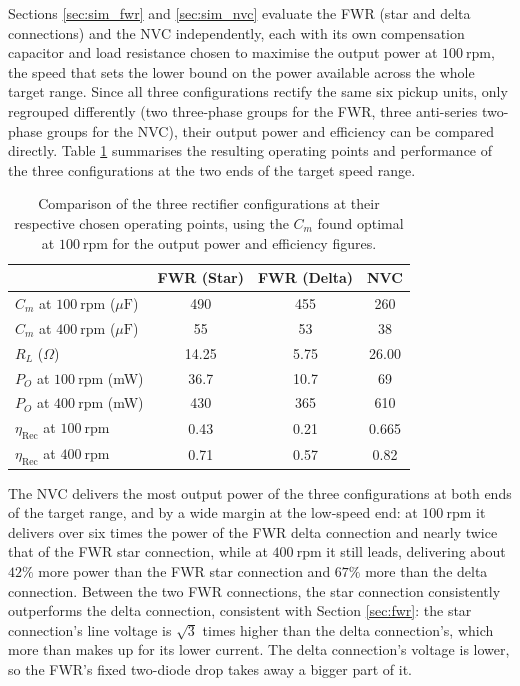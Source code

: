 Sections \ref{sec:sim_fwr} and \ref{sec:sim_nvc} evaluate the FWR (star and delta connections) and the NVC independently, each with its own compensation capacitor and load resistance chosen to maximise the output power at $100\ \text{rpm}$, the speed that sets the lower bound on the power available across the whole target range. Since all three configurations rectify the same six pickup units, only regrouped differently (two three-phase groups for the FWR, three anti-series two-phase groups for the NVC), their output power and efficiency can be compared directly. Table \ref{tab:sim_comparison} summarises the resulting operating points and performance of the three configurations at the two ends of the target speed range.

\begin{table}[htbp]
    \centering
    \begin{tabular}{lccc}
        \toprule
        & FWR (Star) & FWR (Delta) & NVC \\
        \midrule
        $C_m$ at $100\ \text{rpm}$ ($\mu\text{F}$) & 490 & 455 & 260 \\
        $C_m$ at $400\ \text{rpm}$ ($\mu\text{F}$) & 55 & 53 & 38 \\
        $R_L$ ($\Omega$) & 14.25 & 5.75 & 26.00 \\
        $P_O$ at $100\ \text{rpm}$ (mW) & 36.7 & 10.7 & 69 \\
        $P_O$ at $400\ \text{rpm}$ (mW) & 430 & 365 & 610 \\
        $\eta_\text{Rec}$ at $100\ \text{rpm}$ & 0.43 & 0.21 & 0.665 \\
        $\eta_\text{Rec}$ at $400\ \text{rpm}$ & 0.71 & 0.57 & 0.82 \\
        \bottomrule
    \end{tabular}
    \caption{Comparison of the three rectifier configurations at their respective chosen operating points, using the $C_m$ found optimal at $100\ \text{rpm}$ for the output power and efficiency figures.}
    \label{tab:sim_comparison}
\end{table}

The NVC delivers the most output power of the three configurations at both ends of the target range, and by a wide margin at the low-speed end: at $100\ \text{rpm}$ it delivers over six times the power of the FWR delta connection and nearly twice that of the FWR star connection, while at $400\ \text{rpm}$ it still leads, delivering about $42\%$ more power than the FWR star connection and $67\%$ more than the delta connection. Between the two FWR connections, the star connection consistently outperforms the delta connection, consistent with Section \ref{sec:fwr}: the star connection's line voltage is $\sqrt{3}$ times higher than the delta connection's, which more than makes up for its lower current. The delta connection's voltage is lower, so the FWR's fixed two-diode drop takes away a bigger part of it.

